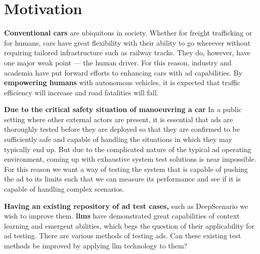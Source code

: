 \chapter{Motivation}

\textbf{Conventional cars} are ubiquitous in society. Whether for freight trafficking or for humans, cars have great flexibility with their ability to go wherever without requiring tailored infrastructure
such as railway tracks. They do, however, have one major weak point --- the human driver. For this
reason, industry and academia have put forward efforts to enhancing cars with \acrfull{ad}
capabilities.
By \textbf{empowering humans} with autonomous vehicles, it is expected that traffic efficiency will
increase and road fatalities will fall.

\textbf{Due to the critical safety situation of manoeuvring a car} In a public setting where other external
actors are present, it is essential that \acrlong{ads} are thoroughly tested before they are
deployed so that they are confirmed to be sufficiently safe and capable of handling the situations in which
they may typically end up.
But due to the complicated nature of the typical \acrshort{ad} operating environment, coming up with
exhaustive system test solutions is near impossible.
For this reason we want a way of testing the system that is capable of pushing the \acrlong{ad} to
its limits such that we can measure its performance and see if it is capable of
handling complex scenarios.

\textbf{Having an existing repository of \acrlong{ad} test cases,} such as
DeepScenario we wish to improve them. \textbf{\acrfull{llms}} have demonstrated
great capabilities of context learning and emergent abilities, which begs
the question of their  applicability for \acrshort{ad} testing.  There are
various methods of testing  \acrlong{ads}. Can these existing test methods be
improved by applying \acrshort{llm} technology to them?

